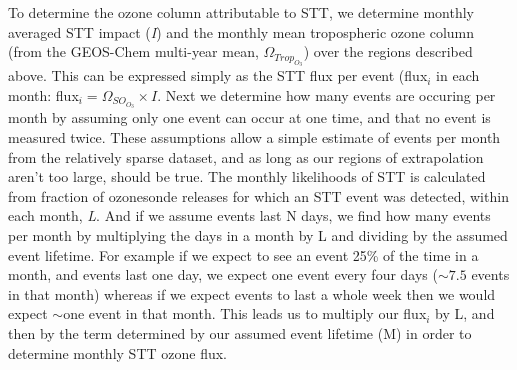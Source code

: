 \documentclass[acp, manuscript]{copernicus} %
\begin{document}
    To determine the ozone column attributable to STT, we determine monthly averaged STT impact (\textit{I}) and the monthly mean tropospheric ozone column (from the GEOS-Chem multi-year mean, $\Omega_{Trop_{O_3}}$) over the regions described above.
    This can be expressed simply as the STT flux per event (flux$_i$ in each month: flux$_i = \Omega_{SO_{O_3}} \times I$.
    Next we determine how many events are occuring per month by assuming only one event can occur at one time, and that no event is measured twice.
    These assumptions allow a simple estimate of events per month from the relatively sparse dataset, and as long as our regions of extrapolation aren't too large, should be true.
    The monthly likelihoods of STT is calculated from fraction of ozonesonde releases for which an STT event was detected, within each month, \textit{L}.
    And if we assume events last N days, we find how many events per month by multiplying the days in a month by L and dividing by the assumed event lifetime.
    For example if we expect to see an event 25\% of the time in a month, and events last one day, we expect one event every four days ($\sim 7.5$ events in that month) whereas if we expect events to last a whole week then we would expect $\sim$one event in that month.
    This leads us to multiply our flux$_i$ by L, and then by the term determined by our assumed event lifetime (M) in order to determine monthly STT ozone flux.
    
\end{document}
